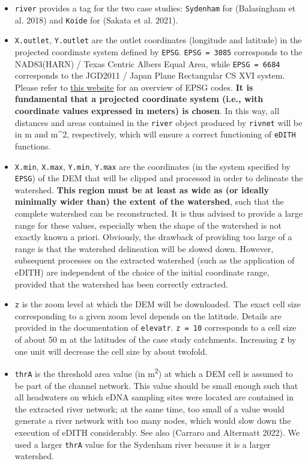 \documentclass[
]{article}
\providecommand{\tightlist}{%
  \setlength{\itemsep}{0pt}\setlength{\parskip}{0pt}}
\begin{document}
\begin{itemize}
\tightlist
\item
  \texttt{river} provides a tag for the two case studies: \texttt{Sydenham} for (Balasingham et al. 2018) and \texttt{Koide} for (Sakata et al. 2021).
\item
  \texttt{X.outlet}, \texttt{Y.outlet} are the outlet coordinates (longitude and latitude) in the projected coordinate system defined by \texttt{EPSG}. \texttt{EPSG\ =\ 3085} corresponds to the NAD83(HARN) / Texas Centric Albers Equal Area, while \texttt{EPSG\ =\ 6684} corresponds to the JGD2011 / Japan Plane Rectangular CS XVI system. Please refer to \href{https://epsg.org/}{this website} for an overview of EPSG codes. \textbf{It is fundamental that a projected coordinate system (i.e., with coordinate values expressed in meters) is chosen}. In this way, all distances and areas contained in the \texttt{river} object produced by \texttt{rivnet} will be in m and m\^{}2, respectively, which will ensure a correct functioning of \texttt{eDITH} functions.
\item
  \texttt{X.min}, \texttt{X.max}, \texttt{Y.min}, \texttt{Y.max} are the coordinates (in the system specified by \texttt{EPSG}) of the DEM that will be clipped and processed in order to delineate the watershed. \textbf{This region must be at least as wide as (or ideally minimally wider than) the extent of the watershed}, such that the complete watershed can be reconstructed. It is thus advised to provide a large range for these values, especially when the shape of the watershed is not exactly known a priori. Obviously, the drawback of providing too large of a range is that the watershed delineation will be slowed down. However, subsequent processes on the extracted watershed (such as the application of eDITH) are independent of the choice of the initial coordinate range, provided that the watershed has been correctly extracted.
\item
  \texttt{z} is the zoom level at which the DEM will be downloaded. The exact cell size corresponding to a given zoom level depends on the latitude. Details are provided in the documentation of \texttt{elevatr}. \texttt{z\ =\ 10} corresponds to a cell size of about 50 m at the latitudes of the case study catchments. Increasing \texttt{z} by one unit will decrease the cell size by about twofold.
\item
  \texttt{thrA} is the threshold area value (in m\textsuperscript{2}) at which a DEM cell is assumed to be part of the channel network. This value should be small enough such that all headwaters on which eDNA sampling sites were located are contained in the extracted river network; at the same time, too small of a value would generate a river network with too many nodes, which would slow down the execution of eDITH considerably. See also (Carraro and Altermatt 2022). We used a larger \texttt{thrA} value for the Sydenham river because it is a larger watershed.

\end{itemize}
\end{document}
